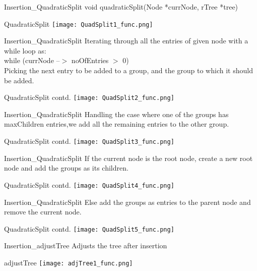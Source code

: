 \documentclass{beamer}
\begin{document}
\begin{frame}{Insertion_{QuadraticSplit}}
void quadraticSplit(Node *currNode, rTree *tree)
    \begin{block}{QuadraticSplit}
       \texttt{[image: QuadSplit1\_func.png]}
    \end{block}
\end{frame}
\begin{frame}{Insertion_{QuadraticSplit}}
Iterating through all the entries of given node with a while loop as:\\
while (currNode --$>$ noOfEntries $>$ 0)\\
Picking the next entry to be added to a group, and the group to which it should be added.
    \begin{block}{QuadraticSplit contd.}
       \texttt{[image: QuadSplit2\_func.png]}
    \end{block}
\end{frame}
\begin{frame}{Insertion_{QuadraticSplit}}
Handling the case where one of the groups has maxChildren entries,we add all the remaining entries to the other group.
    \begin{block}{QuadraticSplit contd.}
       \texttt{[image: QuadSplit3\_func.png]}
    \end{block}
\end{frame}
\begin{frame}{Insertion_{QuadraticSplit}}
If the current node is the root node, create a new root node and add the groups as its children.
    \begin{block}{QuadraticSplit contd.}
       \texttt{[image: QuadSplit4\_func.png]}
    \end{block}
\end{frame}
\begin{frame}{Insertion_{QuadraticSplit}}
Else add the groups as entries to the parent node and remove the current node.
    \begin{block}{QuadraticSplit contd.}
       \texttt{[image: QuadSplit5\_func.png]}
    \end{block}
\end{frame}
\begin{frame}{Insertion_{adjustTree}}
Adjusts the tree after insertion
    \begin{block}{adjustTree}
       \texttt{[image: adjTree1\_func.png]}
    \end{block}
\end{frame}
\end{document}

